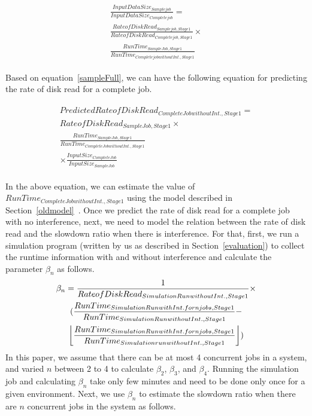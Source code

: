 \begin{eqnarray}
\label{sampleFull}
\begin{gathered}
\frac{InputDataSize_{Sample job}}{InputDataSize_{Complete job}} = \\
\frac{Rate of Disk Read_{Sample job, Stage 1}}{RateofDiskRead_{Complete job, Stage 1}} \times \\
\frac{RunTime_{Sample Job, Stage 1}}{RunTime_{Complete job without Int., Stage 1}}
\end{gathered}
\end{eqnarray}


Based on equation~\ref{sampleFull}, we can have the following equation for predicting the rate of disk read for a complete job. 


\begin{eqnarray}
\label{fullDiskIORead}
\begin{gathered}
Predicted Rate of Disk Read_{Complete Job without Int., Stage1}  = \\
Rate of Disk Read_{Sample Job, Stage 1} \times \\
\frac{RunTime_{Sample Job, Stage 1}}{RunTime_{Complete Job without Int., Stage 1}} \\
\times \frac{Input Size_{Complete Job}}{Input Size_{Sample Job}}
\end{gathered}
\end{eqnarray}

\noindent
In the above equation, we can estimate the value of $RunTime_{Complete Job without Int., Stage 1}$ using the model described in Section~\ref{oldmodel}~\cite{wangperformance}. Once we predict the rate of disk read for a complete job with no interference, next, we need to model the relation between the rate of disk read and the slowdown ratio when there is interference. For that, first, we run a simulation program (written by us as described in Section~\ref{evaluation}) to collect the runtime information with and without interference and calculate the parameter $\beta_{n}$ as follows.
\begin{equation}
\label{beta}
\begin{gathered}
\beta_{n} = \frac{1}{Rate of Disk Read_{Simulation Run without Int., Stage 1}} \times \\
(\frac{RunTime_{Simulation Run with Int. for n jobs, Stage 1}}{RunTime_{Simulation Run without Int., Stage 1}} - \\
\floor*{\frac{RunTime_{Simulation Run with Int. for n jobs, Stage 1}}{RunTime_{Simulation run without Int., Stage 1}}})
\end{gathered}
\end{equation}
\noindent
In this paper, we assume that there can be at most 4 concurrent jobs in a system, and varied $n$ between 2 to 4 to calculate $\beta_{2}$, $\beta_{3}$, and $\beta_{4}$. Running the simulation job and calculating $\beta_{n}$ take only few minutes and need to be done only once for a given environment. Next, we use $\beta_{n}$ to estimate the slowdown ratio when there are $n$ concurrent jobs in the system as follows.

